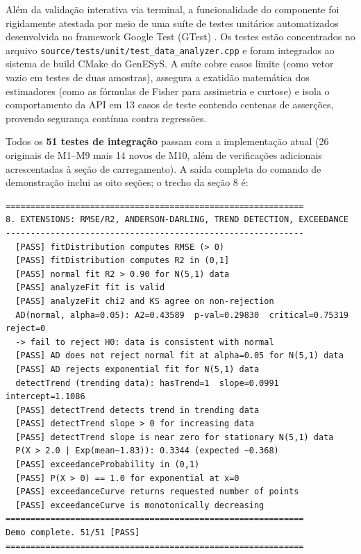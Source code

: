 \vspace{6pt}

Além da validação interativa via terminal, a funcionalidade do componente foi rigidamente atestada por meio de uma suíte de testes unitários automatizados desenvolvida no framework Google Test (GTest) \cite{gtest}. Os testes estão concentrados no arquivo \texttt{source/tests/unit/test\_data\_analyzer.cpp} e foram integrados ao sistema de build CMake do GenESyS. A suíte cobre casos limite (como vetor vazio em testes de duas amostras), assegura a exatidão matemática dos estimadores (como as fórmulas de Fisher \cite{fisher1930} para assimetria e curtose) e isola o comportamento da API em 13 casos de teste contendo centenas de asserções, provendo segurança contínua contra regressões.

Todos os \textbf{51 testes de integração} passam com a implementação atual (26 originais de M1--M9 mais 14 novos de M10, além de verificações adicionais acrescentadas à seção de carregamento). A saída completa do comando de demonstração inclui as oito seções; o trecho da seção 8 é:

\begin{verbatim}
============================================================
8. EXTENSIONS: RMSE/R2, ANDERSON-DARLING, TREND DETECTION, EXCEEDANCE
------------------------------------------------------------
  [PASS] fitDistribution computes RMSE (> 0)
  [PASS] fitDistribution computes R2 in (0,1]
  [PASS] normal fit R2 > 0.90 for N(5,1) data
  [PASS] analyzeFit fit is valid
  [PASS] analyzeFit chi2 and KS agree on non-rejection
  AD(normal, alpha=0.05): A2=0.43589  p-val=0.29830  critical=0.75319  reject=0
  -> fail to reject H0: data is consistent with normal
  [PASS] AD does not reject normal fit at alpha=0.05 for N(5,1) data
  [PASS] AD rejects exponential fit for N(5,1) data
  detectTrend (trending data): hasTrend=1  slope=0.0991  intercept=1.1086
  [PASS] detectTrend detects trend in trending data
  [PASS] detectTrend slope > 0 for increasing data
  [PASS] detectTrend slope is near zero for stationary N(5,1) data
  P(X > 2.0 | Exp(mean~1.83)): 0.3344 (expected ~0.368)
  [PASS] exceedanceProbability in (0,1)
  [PASS] P(X > 0) == 1.0 for exponential at x=0
  [PASS] exceedanceCurve returns requested number of points
  [PASS] exceedanceCurve is monotonically decreasing
============================================================
Demo complete. 51/51 [PASS]
============================================================
\end{verbatim}

